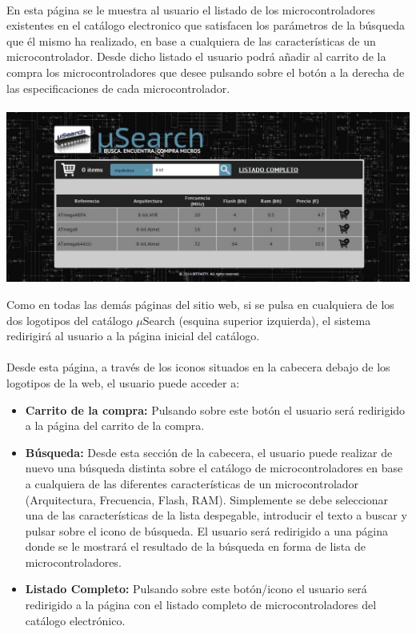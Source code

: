 \paragraph{}En esta página se le muestra al usuario el listado de los microcontroladores existentes en el catálogo electronico que satisfacen los parámetros de la búsqueda que él mismo ha realizado, en base a cualquiera de las características de un microcontrolador. Desde dicho listado el usuario podrá añadir al carrito de la compra los microcontroladores que desee pulsando sobre el botón a la derecha de las especificaciones de cada microcontrolador.

\begin{center}
	\paragraph{}\includegraphics[scale=0.35]{img/listado_busqueda_user}\singlelinebreak
\end{center}

Como en todas las demás páginas del sitio web, si se pulsa en cualquiera de los dos logotipos del catálogo $\mu$Search (esquina superior izquierda), el sistema redirigirá al usuario a la página inicial del catálogo.

\paragraph{}Desde esta página, a través de los iconos situados en la cabecera debajo de los logotipos de la web, el usuario puede acceder a:

\begin{itemize}
	\item\textbf{Carrito de la compra:} Pulsando sobre este botón el usuario será redirigido a la página del carrito de la compra.
	
	\item \textbf{Búsqueda:} Desde esta sección de la cabecera, el usuario puede realizar de nuevo una búsqueda distinta sobre el catálogo de microcontroladores en base a cualquiera de las diferentes características de un microcontrolador (Arquitectura, Frecuencia, Flash, RAM). Simplemente se debe seleccionar una de las características de la lista despegable, introducir el texto a buscar y pulsar sobre el icono de búsqueda.
	El usuario será redirigido a una página donde se le mostrará el resultado de la búsqueda en forma de lista de microcontroladores.
		
	\item \textbf{Listado Completo:} Pulsando sobre este botón/icono el usuario será redirigido a la página con el listado completo de microcontroladores del catálogo electrónico.
\end{itemize}